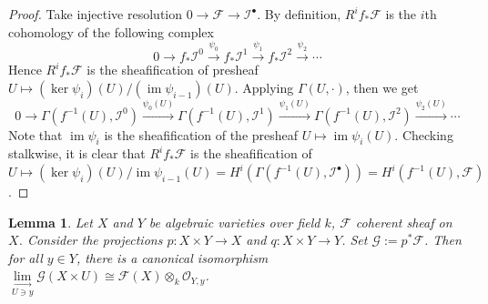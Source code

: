\documentclass{ctexart}
\newtheorem{lemma}{Lemma}[section]
\newcommand{\im}{\operatorname{im}}
\newcommand{\colimit}[1]{\underset{#1}{\underset{\longrightarrow}{\lim}}}
\begin{document}
\begin{proof}
    Take injective resolution $0 \rightarrow \mathcal{F} \rightarrow \mathcal{I}^{\bullet}$.
    By definition, $R^{i}f_{\ast}\mathcal{F}$ is the $i$th cohomology of the following complex
    \begin{equation}
        0 \longrightarrow f_{\ast}\mathcal{I}^{0} \overset{\psi_{0}}{\longrightarrow} f_{\ast}\mathcal{I}^{1} \overset{\psi_{1}}{\longrightarrow} f_{\ast}\mathcal{I}^{2} \overset{\psi_{2}}{\longrightarrow} \cdots
    \end{equation}
    Hence $R^{i}f_{\ast}\mathcal{F}$ is the sheafification of presheaf $U \mapsto (\ker \psi_{i})(U)/(\im \psi_{i - 1})(U)$.
    Applying $\Gamma(U, \cdot)$, then we get
    \begin{equation}
        0 \longrightarrow \Gamma(f^{-1}(U), \mathcal{I}^{0}) \overset{\psi_{0}(U)}{\longrightarrow} \Gamma(f^{-1}(U), \mathcal{I}^{1}) \overset{\psi_{1}(U)}{\longrightarrow} \Gamma(f^{-1}(U), \mathcal{I}^{2}) \overset{\psi_{2}(U)}{\longrightarrow} \cdots
    \end{equation}
    Note that $\im \psi_{i}$ is the sheafification of the presheaf $U \mapsto \im \psi_{i}(U)$.
    Checking stalkwise, it is clear that $R^{i}f_{\ast}\mathcal{F}$ is the sheafification of $U \mapsto (\ker \psi_{i})(U)/\im \psi_{i - 1}(U) = H^{i}(\Gamma(f^{-1}(U), \mathcal{I}^{\bullet})) = H^{i}(f^{-1}(U), \mathcal{F})$.
\end{proof}
\begin{lemma}
    Let $X$ and $Y$ be algebraic varieties over field $k$, $\mathcal{F}$ coherent sheaf on $X$.
    Consider the projections $p: X \times Y \rightarrow X$ and $q: X \times Y \rightarrow Y$.
    Set $\mathcal{G} := p^{\ast}\mathcal{F}$.
    Then for all $y\in Y$, there is a canonical isomorphism $\colimit{U\ni y} \mathcal{G}(X \times U) \cong \mathcal{F}(X) \otimes_{k} \mathcal{O}_{Y, y}$.
    \label{Lemma 7.2}
\end{lemma}
\end{document}
